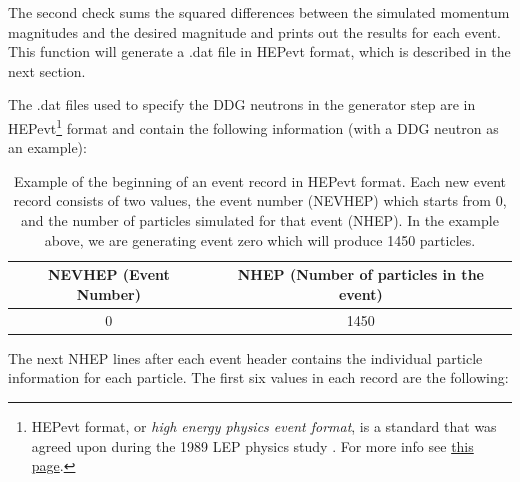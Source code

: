 \documentclass[8pt]{refart}
\begin{document}
The second check sums the squared differences between the simulated momentum magnitudes and the desired magnitude and prints out the results for each event.  This function will generate a .dat file in HEPevt format, which is described in the next section.

The .dat files used to specify the DDG neutrons in the generator step are in HEPevt\footnote{HEPevt format, or \textit{high energy physics event format}, is a standard that was agreed upon during the 1989 LEP physics study \cite{LEP89}.  For more info see \href{https://home.fnal.gov/~mrenna/lutp0613man2/node49.html}{this page}.} format and contain the following information (with a DDG neutron as an example):
\begin{table}[H]
    \centering
    \begin{tabular}{|c|c|}
        \hline
         NEVHEP (Event Number) & NHEP (Number of particles in the event) \\
         \hline
         \hline
         0 & 1450\\
         \hline
    \end{tabular}
    \caption{Example of the beginning of an event record in HEPevt format.  Each new event record consists of two values, the event number (NEVHEP) which starts from 0, and the number of particles simulated for that event (NHEP).  In the example above, we are generating event zero which will produce 1450 particles.}
    \label{tab:my_label}
\end{table}
The next NHEP lines after each event header contains the individual particle information for each particle.  The first six values in each record are the following:
\end{document}
